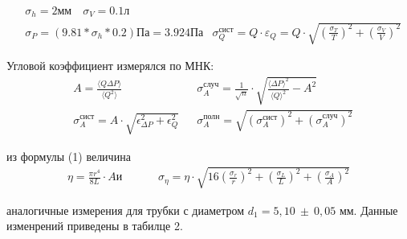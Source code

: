 \documentclass[a4paper, 12pt]{article}
\begin{document}
\begin{align}
    &\sigma_{h} = 2 \text{мм} \quad \sigma_{V} = 0.1 \text{л} \\
    & \sigma_{P} = (9.81 * \sigma_{h} * 0.2) \text{Па} = 3.924 \text{Па}
    &\sigma_Q^\text{сист} = Q \cdot \varepsilon_{Q} = Q \cdot \sqrt{(\frac{\sigma_{T}}{T})^2 + (\frac{\sigma_{V}}{V})^2} 
\end{align}


Угловой коэффициент измерялся по МНК: 
\begin{align}
    & A = \frac{\langle Q \Delta P \rangle}{\langle Q^2 \rangle} &
    & \sigma_A^\text{случ} = \frac{1}{\sqrt{n}}\cdot \sqrt{\frac{\langle \Delta P \rangle ^ 2}{\langle Q \rangle ^ 2} - A^2} \\
    & \sigma_A^\text{сист} = A \cdot \sqrt{\epsilon_{\Delta P}^2 + \epsilon_{Q}^2}
    && \sigma_A^\text{полн} = \sqrt{(\sigma_A^\text{сист})^2 + (\sigma_A^\text{случ})^2}
\end{align}




из формулы (1) величина 
\begin{align}
    \eta = \frac{\pi r^4}{8 L} \cdot A и &&
    && \sigma_{\eta} = \eta \cdot \sqrt{16 (\frac{\sigma_r}{r})^2 + (\frac{\sigma_L}{L})^2 + (\frac{\sigma_A}{A})^2}
\end{align}

аналогичные измерения для трубки с диаметром $d_1=5,10\ \pm\ 0,05$ мм. Данные изменрений приведены в табилце 2.
\end{document}
